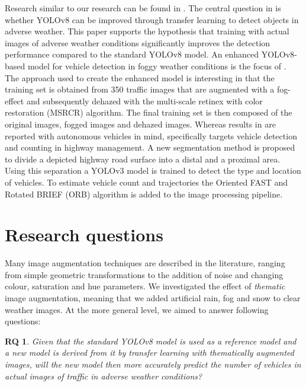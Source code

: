 \documentclass[]{article}
\newtheorem{researchquestion}{RQ}
\begin{document}
	Research similar to our research can be found in \cite{kumarObjectDetectionAdverse2023}. The central question in \cite{kumarObjectDetectionAdverse2023} is whether YOLO{\small v8} can be improved through transfer learning to detect objects in adverse weather. This paper supports the hypothesis that training with actual images of adverse weather conditions significantly improves the detection performance compared to the standard YOLO{\small v8} model. An enhanced YOLO\small{v8}-based model for vehicle detection in foggy weather conditions is the focus of \cite{liVehicleDetectionFoggy2022}. The approach used to create the enhanced model is interesting in that the training set is obtained from 350 traffic images that are augmented with a fog-effect and subsequently dehazed with the multi-scale retinex with color restoration (MSRCR) algorithm. The final training set is then composed of the original images, fogged images and dehazed images. Whereas results in \cite{liVehicleDetectionFoggy2022} are reported with autonomous vehicles in mind, \cite{songVisionbasedVehicleDetection2019} specifically targets vehicle detection and counting in highway management.  A new segmentation method is proposed to divide a depicted highway road surface into a distal and a proximal area. Using this separation a YOLO{\small v3} model is trained to detect the type and location of vehicles. To estimate vehicle count and trajectories the Oriented FAST and Rotated BRIEF (ORB) algorithm is added to the image processing pipeline.
	

\section{Research questions}

	Many image augmentation techniques are described in the literature, ranging from simple geometric transformations to the addition of noise and changing colour, saturation and hue parameters. We investigated the effect of \textit{thematic} image augmentation, meaning that we added artificial rain, fog and snow to clear weather images. At the more general level, we aimed to answer following questions:

	\begin{researchquestion}
	\label{rq1}
	Given that the standard YOLOv8 model is used as a reference model and a new	model is derived from it by transfer learning with thematically augmented images,	will the new model then more accurately predict the number of vehicles in actual images	of traffic in adverse weather conditions?
	\end{researchquestion}
\end{document}
